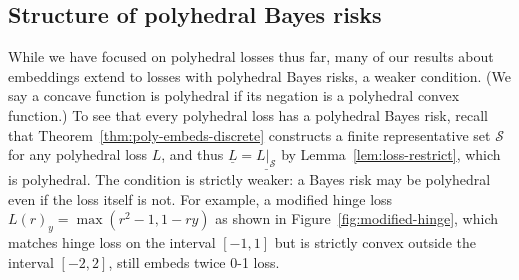 \documentclass[11pt]{article}
\newcommand{\Sc}{\mathcal{S}}
\newcommand{\risk}[1]{\underline{#1}}
\begin{document}
\subsection{Structure of polyhedral Bayes risks}

While we have focused on polyhedral losses thus far, many of our results about embeddings extend to losses with polyhedral Bayes risks, a weaker condition.
(We say a concave function is polyhedral if its negation is a polyhedral convex function.)
To see that every polyhedral loss has a polyhedral Bayes risk, recall that Theorem~\ref{thm:poly-embeds-discrete} constructs a finite representative set $\Sc$ for any polyhedral loss $L$, and thus $\risk{L} = \risk{L|_\Sc}$ by Lemma~\ref{lem:loss-restrict}, which is polyhedral.
The condition is strictly weaker: a Bayes risk may be polyhedral even if the loss itself is not.
For example, a modified hinge loss $L(r)_y = \max(r^2-1,1-ry)$
as shown in Figure~\ref{fig:modified-hinge}, which matches hinge loss on the interval $[-1,1]$ but is strictly convex outside the interval $[-2,2]$, still embeds twice 0-1 loss.
\end{document}
